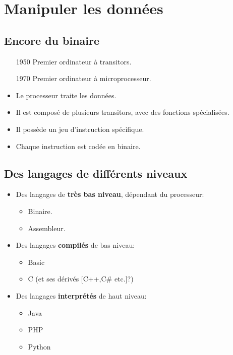 \section[Manipuler]{Manipuler les données}
\subsection{Encore du binaire}

\begin{slide}
	\begin{itemize}
		\item[1950] Premier ordinateur à transitors.
		\item[1970] Premier ordinateur à microprocesseur. %
	\end{itemize}
\end{slide}

\begin{slide}
	\begin{itemize}
		\item Le processeur traite les données.
		\item Il est composé de plusieurs transitors, avec des fonctions spécialisées.
		\item Il possède un jeu d'instruction spécifique.
		\item Chaque instruction est codée en binaire.
	\end{itemize}
\end{slide}

\subsection{Des langages de différents niveaux}

\begin{slide}
	\begin{itemize}
		\item Des langages de \textbf{très bas niveau}, dépendant du processeur:
		\begin{itemize}
			\item Binaire.
			\item Assembleur.
		\end{itemize}
		\item Des langages \textbf{compilés} de bas niveau:
		\begin{itemize}
			\item Basic
			\item C (et ses dérivés [C++,C\# etc.]?)
		\end{itemize}
		\item Des langages \textbf{interprétés} de haut niveau:
		\begin{itemize}
			\item Java
			\item PHP
			\item Python
		\end{itemize}
	\end{itemize}
\end{slide}

